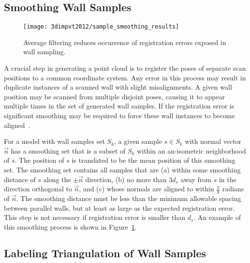 \documentclass[12pt,onecolumn,oneside]{book}
\begin{document}
\subsection{Smoothing Wall Samples}
\label{ssec:eigencrust_smoothing}

\begin{figure}[t]

\begin{minipage}[b]{1.0\linewidth}
  \centering
  \centerline{\texttt{[image: 3dimpvt2012/sample\_smoothing\_results]}}
\end{minipage}

\caption[Smoothing wall samplings.]{Average filtering reduces occurrence of registration errors exposed in wall sampling.}
\label{fig:sample_smoothing_results}

\end{figure}

A crucial step in generating a point cloud is to register the poses of separate scan positions to a common coordinate system.  Any error in this process may result in duplicate instances of a scanned wall with slight misalignments.  A given wall position may be scanned from multiple disjoint poses, causing it to appear multiple times in the set of generated wall samples.  If the registration error is significant smoothing may be required to force these wall instances to become aligned~\cite{Turner12}.

For a model with wall samples set $S_k$, a given sample $s \in S_k$ with normal vector $\vec{n}$ has a smoothing set that is a subset of $S_k$ within an an-isometric neighborhood of $s$.  The position of $s$ is translated to be the mean position of this smoothing set. The smoothing set contains all samples that are (a) within some smoothing distance of $s$ along the $\pm \vec{n}$ direction, (b) no more than $3 d_s$ away from $s$ in the direction orthogonal to $\vec{n}$, and (c) whose normals are aligned to within $\frac{\pi}{8}$ radians of $\vec{n}$.  The smoothing distance must be less than the minimum allowable spacing between parallel walls, but at least as large as the expected registration error.  This step is not necessary if registration error is smaller than $d_s$.  An example of this smoothing process is shown in Figure~\ref{fig:sample_smoothing_results}.

\subsection{Labeling Triangulation of Wall Samples}
\label{ssec:eigencrust_triangulation}
\end{document}
